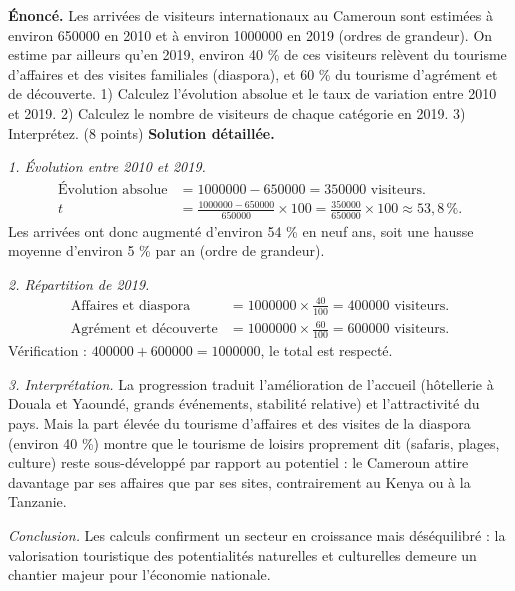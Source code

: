 \documentclass[11pt]{article}
\newcommand{\cle}[1]{{\popxbold\color{popdark}#1}}
\begin{document}
\begin{exoresolu}
\textbf{Énoncé.} Les arrivées de visiteurs internationaux au Cameroun sont estimées à environ \num{650000} en 2010 et à environ \num{1000000} en 2019 (ordres de grandeur). On estime par ailleurs qu'en 2019, environ 40 \% de ces visiteurs relèvent du tourisme d'affaires et des visites familiales (diaspora), et 60 \% du tourisme d'agrément et de découverte. 1) Calculez l'évolution absolue et le taux de variation entre 2010 et 2019. 2) Calculez le nombre de visiteurs de chaque catégorie en 2019. 3) Interprétez. (8 points)
\tcblower
\textbf{Solution détaillée.}

\emph{1. Évolution entre 2010 et 2019.}
\begin{align*}
\text{Évolution absolue} &= \num{1000000} - \num{650000} = \num{350000} \text{ visiteurs.}\\
t &= \frac{\num{1000000} - \num{650000}}{\num{650000}} \times 100 = \frac{\num{350000}}{\num{650000}} \times 100 \approx 53,8\,\%.
\end{align*}
Les arrivées ont donc augmenté d'environ 54 \% en neuf ans, soit une hausse moyenne d'environ 5 \% par an (ordre de grandeur).

\emph{2. Répartition de 2019.}
\begin{align*}
\text{Affaires et diaspora} &= \num{1000000} \times \frac{40}{100} = \num{400000} \text{ visiteurs.}\\
\text{Agrément et découverte} &= \num{1000000} \times \frac{60}{100} = \num{600000} \text{ visiteurs.}
\end{align*}
Vérification : $\num{400000} + \num{600000} = \num{1000000}$, le total est respecté.

\emph{3. Interprétation.} La progression traduit l'amélioration de l'accueil (hôtellerie à Douala et Yaoundé, grands événements, stabilité relative) et l'attractivité du pays. Mais la part élevée du \cle{tourisme d'affaires} et des visites de la diaspora (environ 40 \%) montre que le tourisme de loisirs proprement dit (safaris, plages, culture) reste sous-développé par rapport au potentiel : le Cameroun attire davantage par ses affaires que par ses sites, contrairement au Kenya ou à la Tanzanie.

\emph{Conclusion.} Les calculs confirment un secteur en croissance mais déséquilibré : la valorisation touristique des potentialités naturelles et culturelles demeure un chantier majeur pour l'économie nationale.
\end{exoresolu}
\end{document}
